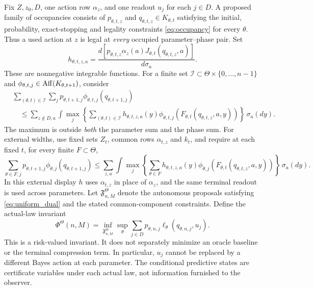 Fix $Z,z_0,D$, one action row $\alpha_z$, and one readout $u_j$ for each $j\in D$. A proposed family of occupancies consists of $p_{\theta,t,z}$ and $q_{\theta,t,z}\in K_{\theta,t}$ satisfying the initial, probability, exact-stopping and legality constraints \eqref{eq:occupancy} for every $\theta$. Thus a used action at $z$ is legal at \emph{every} occupied parameter--phase pair. Set
\[
 h_{\theta,t,z,a}
 =\frac{d[p_{\theta,t,z}\alpha_z(a)J_{\theta,t}(q_{\theta,t,z},a)]}{d\sigma_a}.
\]
These are nonnegative integrable functions. For a finite set
$\mathcal I\subset\Theta\times\{0,\ldots,n-1\}$ and
$\phi_{\theta,t,j}\in\operatorname{Aff}(K_{\theta,t+1})$, consider
\begin{equation}\label{eq:uniform_dual}
\begin{split}
 &\sum_{(\theta,t)\in\mathcal I}\sum_j
       p_{\theta,t+1,j}\phi_{\theta,t,j}(q_{\theta,t+1,j})\\
 &\quad\le\sum_{z\notin D,a}\int
       \max_j\left\{\sum_{(\theta,t)\in\mathcal I}
        h_{\theta,t,z,a}(y)
        \phi_{\theta,t,j}(F_{\theta,t}(q_{\theta,t,z},a,y))\right\}\,\sigma_a(dy).
\end{split}
\end{equation}
The maximum is outside \emph{both} the parameter sum and the phase sum. For external widths, use fixed sets $Z_t$, common rows $\alpha_{t,z}$ and $k_t$, and require at each fixed $t$, for every finite $F\subset\Theta$,
\begin{equation}\label{eq:uniform_ext_dual}
 \sum_{\theta\in F,j}p_{\theta,t+1,j}\phi_{\theta,j}(q_{\theta,t+1,j})
 \le\sum_{z,a}\int\max_j\left\{\sum_{\theta\in F}
 h_{\theta,t,z,a}(y)\phi_{\theta,j}(F_{\theta,t}(q_{\theta,t,z},a,y))\right\}\,\sigma_a(dy).
\end{equation}
In this external display $h$ uses $\alpha_{t,z}$ in place of $\alpha_z$, and the same terminal readout is used across parameters. Let
$\mathfrak F^\Theta_{n,M}$ denote the autonomous proposals satisfying \eqref{eq:uniform_dual} and the stated common-component constraints. Define the actual-law invariant
\begin{equation}\label{eq:uniform_phi}
 \Phi^\Theta(n,M)=\inf_{\mathfrak F^\Theta_{n,M}}
       \sup_\theta\sum_{j\in D}p_{\theta,n,j}
                         \ell_\theta(q_{\theta,n,j},u_j).
\end{equation}
This is a risk-valued invariant. It does not separately minimize an oracle baseline or the terminal compression term. In particular, $u_j$ cannot be replaced by a different Bayes action at each parameter. The conditional predictive states are certificate variables under each actual law, not information furnished to the observer.

